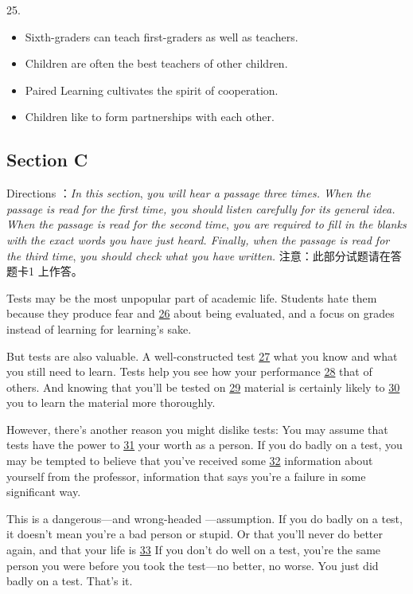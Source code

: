 \documentclass[UTF8,11pt]{ctexart}
\begin{document}
25.


\begin{itemize}[leftmargin=2em,itemsep=.2em,topsep=.4em]\item[A.] Sixth-graders can teach first-graders as well as teachers.
\item[B.] Children are often the best teachers of other children.
\item[C.] Paired Learning cultivates the spirit of cooperation.
\item[D.] Children like to form partnerships with each other.
\end{itemize}

\subsection*{\textbf{Section C}}


Directions ：\textit{In this section},\textit{ you will hear a passage three times. When the passage is read for the first time, you should} \textit{listen carefully for its general idea. When the passage is read for the second time},\textit{ you are required to fill in the blanks with} \textit{the exact words you have just heard. Finally, when the passage is read for the third time},\textit{ you should check what you have} \textit{written.} 注意：此部分试题请在答题卡1 上作答。


Tests may be the most unpopular part of academic life. Students hate them because they produce fear and \uline{26} about being evaluated, and a focus on grades instead of learning for learning’s sake.


But tests are also valuable. A well-constructed test \uline{27} what you know and what you still need to learn. Tests help you see how your performance \uline{28} that of others. And knowing that you’ll be tested on \uline{29} material is certainly likely to \uline{30} you to learn the material more thoroughly.


However, there’s another reason you might dislike tests: You may assume that tests have the power to \uline{31} your worth as a person. If you do badly on a test, you may be tempted to believe that you’ve received some \uline{32} information about yourself from the professor, information that says you’re a failure in some significant way.


This is a dangerous—and wrong-headed —assumption. If you do badly on a test, it doesn’t mean you’re a bad person or stupid. Or that you’ll never do better again, and that your life is \uline{33} If you don’t do well on a test, you’re the same person you were before you took the test—no better, no worse. You just did badly on a test. That’s it.
\end{document}
